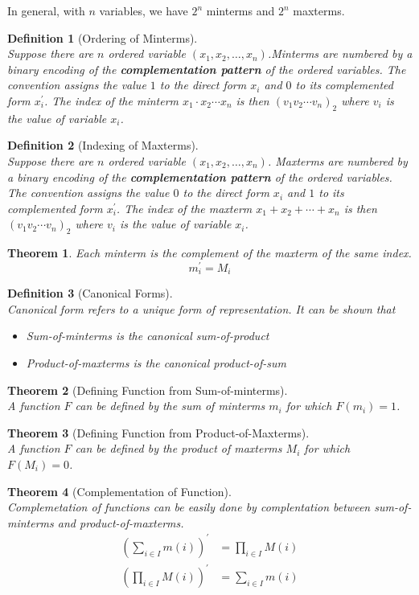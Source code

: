 \documentclass[12pt]{article}
\newtheorem{definition}{Definition}[section]
\newtheorem{theorem}{Theorem}[section]
\theoremstyle{definition}
\begin{document}
In general, with $n$ variables, we have $2^n$ minterms and $2^n$ maxterms.
\begin{definition}[Ordering of Minterms]
\hfill\\\normalfont Suppose there are $n$ ordered variable $(x_1,x_2,\ldots, x_n)$.Minterms are numbered by a binary encoding of the \textbf{complementation pattern} of the ordered variables. The convention assigns the value $1$ to the direct form $x_i$ and $0$ to its complemented form $x_i^\prime$. The index of the minterm $x_1\cdot x_2\cdots x_n$ is then $(v_1v_2\cdots v_n)_2$ where $v_i$ is the value of variable $x_i$.
\end{definition}
\begin{definition}[Indexing of Maxterms]
\hfill\\\normalfont Suppose there are $n$ ordered variable $(x_1,x_2,\ldots, x_n)$. Maxterms are numbered by a binary encoding of the \textbf{complementation pattern} of the ordered variables. The convention assigns the value $0$ to the direct form $x_i$ and $1$ to its complemented form $x_i^\prime$. The index of the maxterm $x_1+ x_2+\cdots+ x_n$ is then $(v_1v_2\cdots v_n)_2$ where $v_i$ is the value of variable $x_i$.
\end{definition}
\begin{theorem}\normalfont Each minterm is the complement of the maxterm of the same index.
\[
m_i^\prime = M_i 
\]
\end{theorem}
\begin{definition}[Canonical Forms]
\hfill\\\normalfont Canonical form refers to a unique form of representation. It can be shown that
\begin{itemize}
\item Sum-of-minterms is the canonical sum-of-product
\item Product-of-maxterms is the canonical product-of-sum
\end{itemize}
\end{definition}
\begin{theorem}[Defining Function from Sum-of-minterms]
\hfill\\\normalfont A function $F$ can be defined by the sum of minterms $m_i$ for which $F(m_i) = 1$.
\end{theorem}
\begin{theorem}[Defining Function from Product-of-Maxterms]
\hfill\\\normalfont A function $F$ can be defined by the product of maxterms $M_i$ for which $F(M_i) = 0$.
\end{theorem}
\begin{theorem}[Complementation of Function]
\hfill\\\normalfont Complemetation of functions can be easily done by complentation between sum-of-minterms and product-of-maxterms.
\begin{align*}
\left(\sum_{i\in I} m(i)\right)^\prime &= \prod_{i\in I} M(i)\\
\left(\prod_{i\in I} M(i)\right)^\prime&=\sum_{i\in I} m(i)
\end{align*}
\end{theorem}
\end{document}
